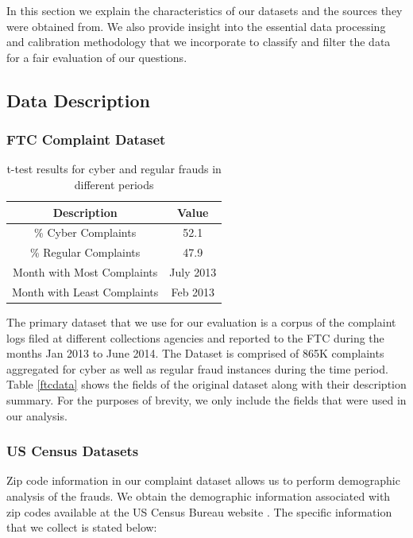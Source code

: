 \documentclass[conference]{IEEEtran}
\begin{document}
In this section we explain the characteristics of our datasets and the sources they were obtained from. We also provide insight into the essential data processing and calibration methodology that we incorporate to classify and filter the data for a fair evaluation of our questions.

\subsection{Data Description}

\subsubsection{FTC Complaint Dataset}

\begin{table}[h]
\centering
\begin{tabular}{c|c}
\hline
{\bfseries Description} & \multicolumn{1}{c}{\bfseries Value}
\\
\hline
\hline
\% Cyber Complaints &52.1\\
\hline
\% Regular Complaints & 47.9\\
\hline
Month with Most Complaints & July 2013\\
\hline
Month with Least Complaints & Feb 2013\\
\hline
\end{tabular}
\vspace{8pt}
\caption{t-test results for cyber and regular frauds in different periods}\label{ttest}
\vspace{-10pt}
\end{table}


The primary dataset that we use for our evaluation is a corpus of the complaint logs filed at different collections agencies and reported to the FTC during the months Jan 2013 to June 2014. The Dataset is comprised of 865K complaints aggregated for cyber as well as regular fraud instances during the time period. Table \ref{ftcdata} shows the fields of the original dataset along with their description summary. For the purposes of brevity, we only include the fields that were used in our analysis.
\\
\subsubsection{US Census Datasets}
Zip code information in our complaint dataset allows us to perform demographic analysis of the frauds. We obtain the demographic information associated with zip codes available at the US Census Bureau website \cite{uscensus}. The specific information that we collect is stated below:
\end{document}
